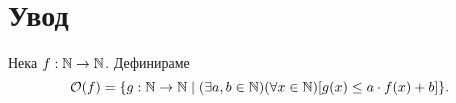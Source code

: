 \chapter{Увод}\label{ch:intro}















% 


Нека $f:\mathbb{N} \to \mathbb{N}$. Дефинираме
\[\mathcal{O}(f) = \{g : \mathbb{N} \to \mathbb{N} \mid (\exists a,b\in\mathbb{N})(\forall x\in\mathbb{N})[g(x) \leq a \cdot f(x) + b]\}.\]

